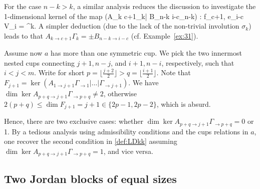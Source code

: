 \documentclass[11pt,reqno]{amsart}
\numberwithin{equation}{section}
\theoremstyle{definition}
\def\<{\langle}
\def\>{\rangle}
\begin{document}
For the case $n-k > k$, a similar analysis reduces the discussion to investigate the 1-dimensional kernel of the map 
\eq
(A_{k \to c+1}\Gamma_{k}| B_{n-k \to i-c}\Gamma_{n-k}) :
\<f_{c+1}, e_{i-c}\> \to V_i = \CC^k.
\endeq
A simpler deduction (due to the lack of the non-trivial involution $\sigma_k$) leads to that 
$A_{k \to c+1}\Gamma_{k} = \pm B_{n-k \to i-c}$ (cf. Example~\ref{ex:31}).

Assume now $a$ has more than one symmetric cup. We pick the two innermost nested cups connecting $j+1, n-j$, and $i+1, n-i$, respectively, such that $i<j < m$.
Write for short $p = \lfloor\frac{j+2}{2}\rfloor > q = \lfloor\frac{i+1}{2}\rfloor$.
Note that $F_{j+1} = \ker (A_{1\to {j+1}}\Gamma_{\to 1}| \ldots | \Gamma_{\to j+1})$. 
We have $\dim\ker A_{p+q\to j+1}\Gamma_{\to p+q} \neq 2$, otherwise
$2(p+q) \leq \dim F_{j+1} = j+1 \in \{2p-1, 2p-2\}$, which is absurd.

Hence, there are two exclusive cases: whether $\dim\ker A_{p+q\to j+1}\Gamma_{\to p+q} = 0$ or 1.
By a tedious analysis using admissibility conditions and the cups relations in $a$, one recover the second condition in \eqref{def:LDkk} assuming $\dim\ker A_{p+q\to j+1}\Gamma_{\to p+q} = 1$, and vice versa.
\endproof


\subsection{Two Jordan blocks of equal sizes}
\end{document}
